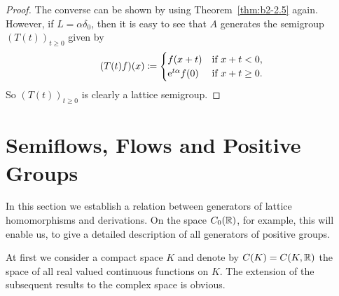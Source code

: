 \begin{proof}
The converse can be shown by using Theorem~\ref{thm:b2-2.5} again.
However, if\/ $L = \alpha\delta_{0}$, then it is easy to see that $A$ generates the semigroup $(T(t))_{t \geq 0}$ given by
\begin{equation*}
(T(t)f)(x) \coloneq \begin{cases}
    f(x+t) & \text{if } x+t < 0  ,\\
    \eu^{t\alpha}f(0) & \text{if } x+t \geq 0  .
\end{cases}
\end{equation*}
So $(T(t))_{t \geq 0}$ is clearly a lattice semigroup.
\end{proof}
\section{Semiflows, Flows and Positive Groups}\label{sec:b2-3}
In this section we establish a relation between generators of lattice homomorphisms and derivations.
On the space $C_{0}(\mathbb{R})$, for example, this will enable us, to give a detailed description of all generators of positive groups.

At first we consider a compact space $K$ and denote by $C(K) = C(K,\mathbb{R})$ the space of all real valued continuous functions on $K$.
The extension of the subsequent results to the complex space is obvious.

